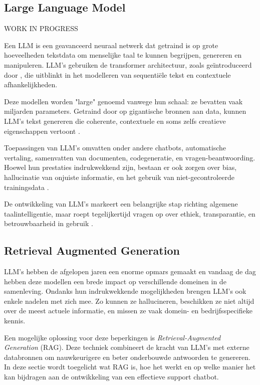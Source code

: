     \subsection{Large Language Model}
    
    
    WORK IN PROGRESS
    
     Een LLM is een geavanceerd neuraal netwerk dat getraind is op grote hoeveelheden tekstdata om menselijke taal te kunnen begrijpen, genereren en manipuleren. LLM's gebruiken de transformer architectuur, zoals geïntroduceerd door \textcite{Vaswani2017}, die uitblinkt in het modelleren van sequentiële tekst en contextuele afhankelijkheden.
      
     Deze modellen worden "large" genoemd vanwege hun schaal: ze bevatten vaak miljarden parameters. Getraind door op gigantische bronnen aan data, kunnen LLM's tekst genereren die coherente, contextuele en soms zelfs creatieve eigenschappen vertoont \cite{Gupta2025}.
      
     Toepassingen van LLM's omvatten onder andere chatbots, automatische vertaling, samenvatten van documenten, codegeneratie, en vragen-beantwoording. Hoewel hun prestaties indrukwekkend zijn, bestaan er ook zorgen over bias, hallucinatie van onjuiste informatie, en het gebruik van niet-gecontroleerde trainingsdata \cite{Gupta2025}.
      
     De ontwikkeling van LLM’s markeert een belangrijke stap richting algemene taalintelligentie, maar roept tegelijkertijd vragen op over ethiek, transparantie, en betrouwbaarheid in gebruik \cite{Gupta2025}.
     
    \subsection{Retrieval Augmented Generation}
    
    LLM's hebben de afgelopen jaren een enorme opmars gemaakt en vandaag de dag hebben deze modellen een brede impact op verschillende domeinen in de samenleving. Ondanks hun indrukwekkende mogelijkheden brengen LLM’s ook enkele nadelen met zich mee. Zo kunnen ze hallucineren, beschikken ze niet altijd over de meest actuele informatie, en missen ze vaak domein- en bedrijfsspecifieke kennis.  
    
    Een mogelijke oplossing voor deze beperkingen is \textit{Retrieval-Augmented Generation} (RAG). Deze techniek combineert de kracht van LLM’s met externe databronnen om nauwkeurigere en beter onderbouwde antwoorden te genereren. In deze sectie wordt toegelicht wat RAG is, hoe het werkt en op welke manier het kan bijdragen aan de ontwikkeling van een effectieve support chatbot.
    
